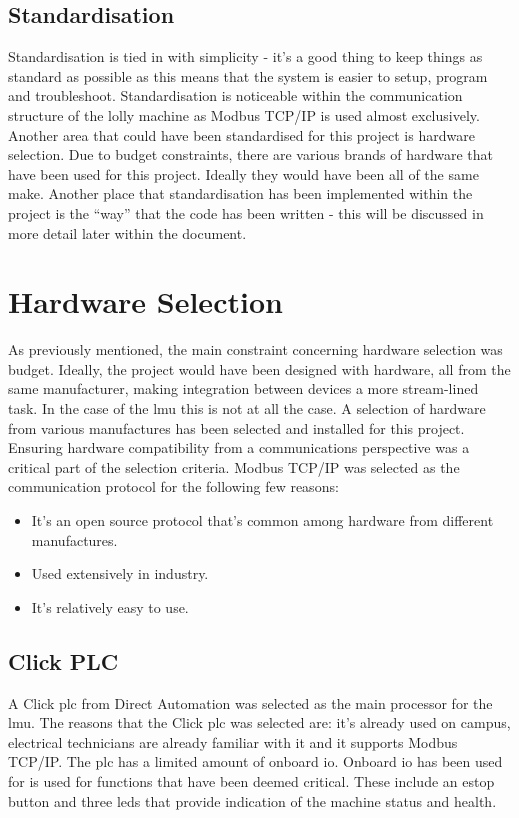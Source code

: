     \subsection{Standardisation}
        Standardisation is tied in with simplicity - it's a good thing to keep things as standard as possible as this means that the system is easier to setup, program and troubleshoot. Standardisation is noticeable within the communication structure of the lolly machine as Modbus TCP/IP is used almost exclusively. Another area that could have been standardised for this project is hardware selection. Due to budget constraints,  there are various brands of hardware that have been used for this project. Ideally they would have been all of the same make. Another place that standardisation has been implemented within the project is the “way” that the code has been written - this will be discussed in more detail later within the document.
    
    
        
    \section {Hardware Selection}
        As previously mentioned, the main constraint concerning hardware selection was budget. Ideally, the project would have been designed with hardware, all from the same manufacturer, making integration between devices a more stream-lined task. In the case of the \acrshort{lmu} this is not at all the case. A selection of hardware from various manufactures has been selected and installed for this project. Ensuring hardware compatibility from a communications perspective was a critical part of the selection criteria. Modbus TCP/IP was selected as the communication protocol for the following few reasons:
        \begin{itemize}[noitemsep]
            \item It's an open source protocol that's common among hardware from different manufactures.
            \item Used extensively in industry.
            \item It's relatively easy to use.
        \end{itemize}
    
        
    
    \subsection{Click PLC}
        A Click \acrshort{plc} from Direct Automation was selected as the main processor for the \acrshort{lmu}. The reasons that the Click \acrshort{plc} was selected are: it's already used on campus, electrical technicians are already familiar with it and it supports Modbus TCP/IP. The \acrshort{plc} has a limited amount of onboard \acrshort{io}. Onboard \acrshort{io} has been used for is used for functions that have been deemed critical. These include an \acrshort{estop} button and three \acrshort{led}s that provide indication of the machine status and health.
    
